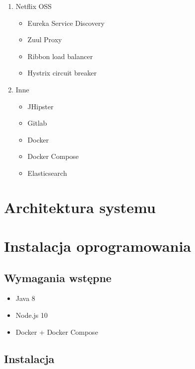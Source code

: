 \begin{enumerate}
    \item Netflix OSS\cite{tech:netflix-oss}
    \begin{itemize}
        \item Eureka Service Discovery\cite{tech:netflix-eureka}
        \item Zuul Proxy\cite{tech:netflix-zuul}
        \item Ribbon load balancer\cite{tech:netflix-ribbon}
        \item Hystrix circuit breaker\cite{tech:netflix-hystrix}
    \end{itemize}
    \item Inne
    \begin{itemize}
        \item JHipster\cite{tech:jhipster}
        \item Gitlab\cite{tech:gitlab}
        \item Docker\cite{tech:docker}
        \item Docker Compose\cite{tech:docker-compose}
        \item Elasticsearch\cite{tech:elasticsearch}
    \end{itemize}
\end{enumerate}
\section{Architektura systemu}\label{sec:system-architecture}
\section{Instalacja oprogramowania}\label{sec:software-installation}
\subsection{Wymagania wstępne}\label{subsec:prerequirements}
\begin{itemize}
    \item Java 8\cite{tech:java}
    \item Node.js 10\cite{tech:nodejs}
    \item Docker\cite{tech:docker} + Docker Compose\cite{tech:docker-compose}
\end{itemize}
\subsection{Instalacja}\label{subsec:installation}

